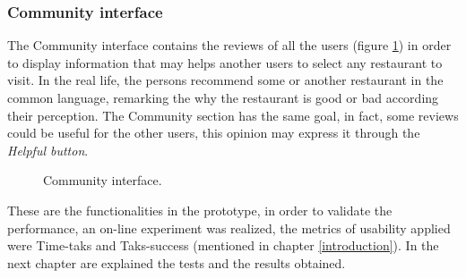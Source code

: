 \subsubsection{Community interface}
The Community interface contains the reviews of all the users (figure
\ref{fig:community}) in order to display information that may helps 
another users to select any restaurant to visit. In the real life, the 
persons recommend some or another restaurant in the common 
language, remarking the why the restaurant is good or bad according 
their perception. The Community section has the same goal, in fact, 
some reviews could be useful for the other users, this opinion may 
express it through the \textit{Helpful button}.
\begin{figure}
\captionsetup{font=footnotesize}
\centering
{}
\caption{Community interface.}
\label{fig:community}   
\end{figure}

These are the functionalities in the prototype, in order to validate
the performance, an on-line experiment was realized, the metrics 
of usability applied were Time-taks and Taks-success (mentioned 
in chapter  \ref{introduction}). In the next chapter are 
explained the tests  and the results obtained.







